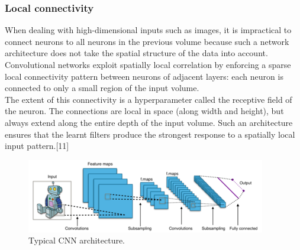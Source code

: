 \documentclass[12pt,a4paper]{article}
\begin{document}
\subsubsection{Local connectivity}
When dealing with high-dimensional inputs such as images, it is impractical to connect neurons to all neurons in the previous volume because such a network architecture does not take the spatial structure of the data into account. Convolutional networks exploit spatially local correlation by enforcing a sparse local connectivity pattern between neurons of adjacent layers: each neuron is connected to only a small region of the input volume.\\
The extent of this connectivity is a hyperparameter called the receptive field of the neuron. The connections are local in space (along width and height), but always extend along the entire depth of the input volume. Such an architecture ensures that the learnt filters produce the strongest response to a spatially local input pattern.[11]
\begin{figure}[h]
\centerline{\includegraphics[scale=1]{395px-Typical_cnn.png}}
\caption{Typical CNN architecture.}
\label{fig 9}
\end{figure}
\end{document}
